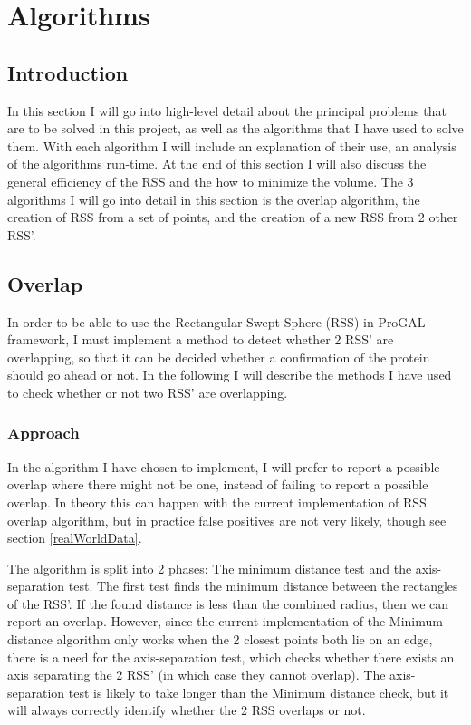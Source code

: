 
\section{Algorithms}
\label{algorithms}

\subsection{Introduction}
In this section I will go into high-level detail about the principal problems that are to be solved in this project, as well as the algorithms that I have used to solve them. With each algorithm I will include an explanation of their use, an analysis of the algorithms run-time. At the end of this section I will also discuss the general efficiency of the RSS and the how to minimize the volume.
The 3 algorithms I will go into detail in this section is the overlap algorithm, the creation of RSS from a set of points, and the creation of a new RSS from 2 other RSS'.

\subsection{Overlap}
\label{overlap}
In order to be able to use the Rectangular Swept Sphere (RSS) in ProGAL framework, I must implement a method to detect whether 2 RSS' are overlapping, so that it can be decided whether a confirmation of the protein should go ahead or not. In the following I will describe the methods I have used to check whether or not two RSS' are overlapping.

\subsubsection{Approach}
In the algorithm I have chosen to implement, I will prefer to report a possible overlap where there might not be one, instead of failing to report a possible overlap. In theory this can happen with the current implementation of RSS overlap algorithm, but in practice false positives are not very likely, though see section \ref{realWorldData}.

The algorithm is split into 2 phases: The minimum distance test and the axis-separation test. The first test finds the minimum distance between the rectangles of the RSS'. If the found distance is less than the combined radius, then we can report an overlap. However, since the current implementation of the Minimum distance algorithm only works when the 2 closest  points both lie on an edge, there is a need for the axis-separation test, which checks whether there exists an axis separating the 2 RSS' (in which case they cannot overlap). The axis-separation test is likely to take longer than the Minimum distance check, but it will always correctly identify whether the 2 RSS overlaps or not.


